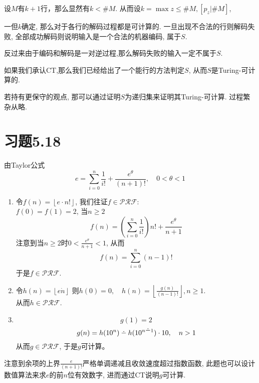 \documentclass{article}
\newcommand{\floor}[1]{\left\lfloor #1 \right\rfloor}
\def\dotminus{\mathbin{\ooalign{\hss\raise1ex\hbox{.}\hss\cr
  \mathsurround=0pt$-$}}}
\begin{document}
设$M$有$k+1$行，那么显然有$k < \#M$. 
从而设$k = \max z \le \#M, [p_z | \#M]$, 

一但$k$确定, 那么对于各行的解码过程都是可计算的. 一旦出现不合法的行则解码失败, 全部成功解码则说明输入是一个合法的机器编码, 属于$S$. 

反过来由于编码和解码是一对逆过程,那么解码失败的输入一定不属于$S$. 

如果我们承认CT,那么我们已经给出了一个能行的方法判定$S$, 从而$S$是Turing-可计算的. 

若持有更保守的观点, 那可以通过证明$S$为递归集来证明其Turing-可计算. 过程繁杂从略. 

\section*{习题5.18}


由Taylor公式
$$e=\sum_{i=0}^n\frac{1}{i!}+\frac{e^\theta}{(n+1)!}, \quad 0<\theta<1$$
\begin{enumerate}[(1)]
\item 
令$f(n) = \floor{e\cdot n!}$, 我们往证$f \in \mathcal{PRF}$:\\
$f(0)=f(1)=2$, 当$n\ge 2$
$$f(n)=\left(\sum_{i=0}^n\frac{1}{i!}\right)n!+\frac{e^\theta}{n+1}$$
注意到当$n\ge 2$时$0< \frac{e^\theta}{n+1} < 1$, 从而
$$f(n) = \sum_{i=0}^n (n-1)!$$
于是$f \in \mathcal{PRF}$. 
\item
令$h(n)=\floor{e\dot n}$
则$h(0)=0,\quad h(n) = \floor{\frac{g(n)}{(n-1)!}}, n \ge 1$.  \\
从而$h \in \mathcal{PRF}$. 
\item
$$g(1) = 2$$
$$g(n) = h(10^n) \dotminus h(10^{n\dotminus 1}) \cdot 10, \quad n > 1$$
从而$g \in \mathcal{PRF}$, 于是$g$可计算。

\end{enumerate}
注意到余项的上界$\frac{e}{(n+1)!}$严格单调递减且收敛速度超过指数函数, 此题也可以设计数值算法来求$e$的前$n$位有效数字, 进而通过CT说明$g$可计算. 
\end{document}
